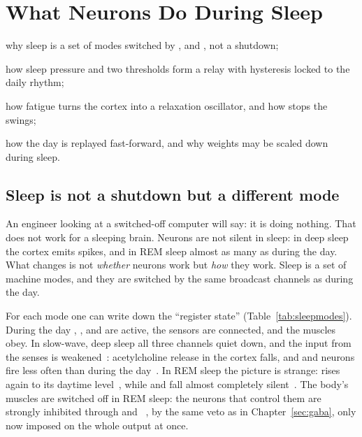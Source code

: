 \chapter{What Neurons Do During Sleep}
\label{sec:sleep}
\begin{chaptergoals}
\item why sleep is a set of modes switched by ,  and , not a shutdown;
\item how sleep pressure and two thresholds form a relay with hysteresis locked to the daily rhythm;
\item how fatigue turns the cortex into a relaxation oscillator, and how  stops the swings;
\item how the day is replayed fast-forward, and why weights may be scaled down during sleep.
\end{chaptergoals}

\section{Sleep is not a shutdown but a different mode}

An engineer looking at a switched-off computer will say: it is doing nothing. That does not work for a sleeping brain. Neurons are not silent in sleep: in deep sleep the cortex emits spikes, and in REM sleep almost as many as during the day. What changes is not \emph{whether} neurons work but \emph{how} they work. Sleep is a set of machine modes, and they are switched by the same broadcast channels as during the day.

For each mode one can write down the ``register state'' (Table~\ref{tab:sleepmodes}). During the day , , and  are active, the sensors are connected, and the muscles obey. In slow-wave, deep sleep all three channels quiet down, and the input from the senses is weakened~\cite{Hasselmo1999}: acetylcholine release in the cortex falls, and  and  neurons fire less often than during the day~\cite{Marrosu1995,AstonJonesBloom1981,McGintyHarper1976}. In REM sleep the picture is strange:  rises again to its daytime level~\cite{Marrosu1995}, while  and  fall almost completely silent~\cite{AstonJonesBloom1981,McGintyHarper1976,JacobsAzmitia1992}. The body's muscles are switched off in REM sleep: the  neurons that control them are strongly inhibited through  and ~\cite{BrooksPeever2012}, by the same veto as in Chapter~\ref{sec:gaba}, only now imposed on the whole output at once.

